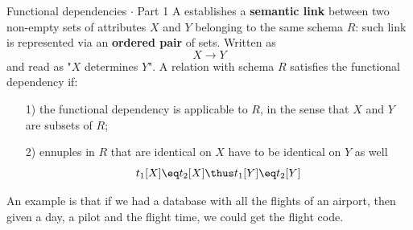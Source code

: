 \begin{definition}{Functional dependencies $\cdot$ Part 1}
    A \textbf{} establishes a \textbf{semantic link} between two non-empty sets of attributes $X$ and $Y$ belonging to the same schema $R$: such link is represented via an \textbf{ordered pair} of sets. Written as
    \[ X \rightarrow Y \]
    and read as "$X$ determines $Y$". A relation with schema $R$ satisfies the functional dependency if:
    \begin{itemize}
        \item [1)] the functional dependency is applicable to $R$, in the sense that $X$ and $Y$ are subsets of $R$;
        \item [2)] ennuples in $R$ that are identical on $X$ have to be identical on $Y$ as well
        \[ t_1[X] \eq t_2[X] \thus t_1[Y] \eq t_2[Y]\]
    \end{itemize}
\end{definition}

An example is that if we had a database with all the flights of an airport, then given a day, a pilot and the flight time, we could get the flight code.